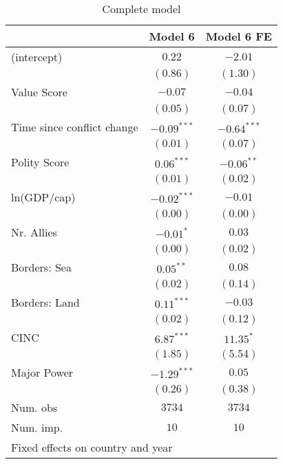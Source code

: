 
\begin{table}
\begin{center}
\begin{tabular}{l c c}
\toprule
 & Model 6 & Model 6 FE \\
\midrule
(intercept)                & $0.22$        & $-2.01$       \\
                           & $(0.86)$      & $(1.30)$      \\
Value Score                & $-0.07$       & $-0.04$       \\
                           & $(0.05)$      & $(0.07)$      \\
Time since conflict change & $-0.09^{***}$ & $-0.64^{***}$ \\
                           & $(0.01)$      & $(0.07)$      \\
Polity Score               & $0.06^{***}$  & $-0.06^{**}$  \\
                           & $(0.01)$      & $(0.02)$      \\
ln(GDP/cap)                & $-0.02^{***}$ & $-0.01$       \\
                           & $(0.00)$      & $(0.00)$      \\
Nr. Allies                 & $-0.01^{*}$   & $0.03$        \\
                           & $(0.00)$      & $(0.02)$      \\
Borders: Sea               & $0.05^{**}$   & $0.08$        \\
                           & $(0.02)$      & $(0.14)$      \\
Borders: Land              & $0.11^{***}$  & $-0.03$       \\
                           & $(0.02)$      & $(0.12)$      \\
CINC                       & $6.87^{***}$  & $11.35^{*}$   \\
                           & $(1.85)$      & $(5.54)$      \\
Major Power                & $-1.29^{***}$ & $0.05$        \\
                           & $(0.26)$      & $(0.38)$      \\
\midrule
Num. obs                   & $3734$        & $3734$        \\
Num. imp.                  & $10$          & $10$          \\
\bottomrule
\multicolumn{3}{l}{\scriptsize{%
               Fixed effects on country and year}}
\end{tabular}
\caption{Complete model}
\label{UCDP_4}
\end{center}
\end{table}
